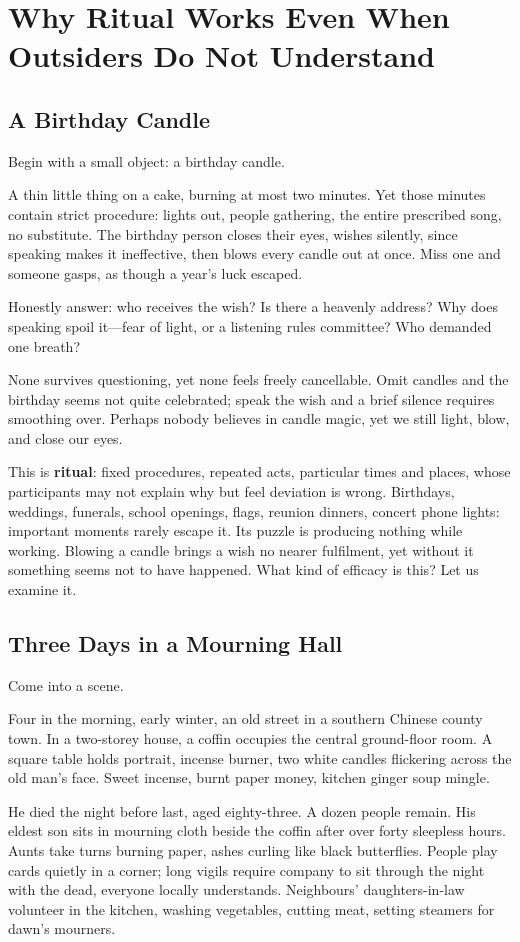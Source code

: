 \chapter[Why Ritual Works]{Why Ritual Works Even When Outsiders Do Not Understand}
\section{A Birthday Candle}
Begin with a small object: a birthday candle.

A thin little thing on a cake, burning at most two minutes. Yet those minutes contain strict procedure: lights out, people gathering, the entire prescribed song, no substitute. The birthday person closes their eyes, wishes silently, since speaking makes it ineffective, then blows every candle out at once. Miss one and someone gasps, as though a year's luck escaped.

Honestly answer: who receives the wish? Is there a heavenly address? Why does speaking spoil it---fear of light, or a listening rules committee? Who demanded one breath?

None survives questioning, yet none feels freely cancellable. Omit candles and the birthday seems not quite celebrated; speak the wish and a brief silence requires smoothing over. Perhaps nobody believes in candle magic, yet we still light, blow, and close our eyes.

This is \textbf{ritual}: fixed procedures, repeated acts, particular times and places, whose participants may not explain why but feel deviation is wrong. Birthdays, weddings, funerals, school openings, flags, reunion dinners, concert phone lights: important moments rarely escape it. Its puzzle is producing nothing while working. Blowing a candle brings a wish no nearer fulfilment, yet without it something seems not to have happened. What kind of efficacy is this? Let us examine it.

\section{Three Days in a Mourning Hall}
Come into a scene.

Four in the morning, early winter, an old street in a southern Chinese county town. In a two-storey house, a coffin occupies the central ground-floor room. A square table holds portrait, incense burner, two white candles flickering across the old man's face. Sweet incense, burnt paper money, kitchen ginger soup mingle.

He died the night before last, aged eighty-three. A dozen people remain. His eldest son sits in mourning cloth beside the coffin after over forty sleepless hours. Aunts take turns burning paper, ashes curling like black butterflies. People play cards quietly in a corner; long vigils require company to sit through the night with the dead, everyone locally understands. Neighbours' daughters-in-law volunteer in the kitchen, washing vegetables, cutting meat, setting steamers for dawn's mourners.

